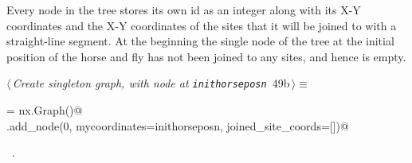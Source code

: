 \documentclass[11.5pt]{report}
\begin{document}
\vspace{-0.8cm} \newchunk Every node in the tree stores its own id as an integer along with 
its X-Y coordinates and the X-Y coordinates of the sites that it will be joined to with a 
straight-line segment. At the beginning the single node of the tree at the initial position
of the horse and fly has not been joined to any sites, and hence is empty. 

\begin{flushleft} \small
\begin{minipage}{\linewidth}\label{scrap76}\raggedright\small
{} $\langle\,${\itshape Create singleton graph, with node at \verb|inithorseposn|}\nobreak\ {\footnotesize {49b}}$\,\rangle\equiv$
\vspace{-1ex}
\begin{list}{}{} \item
\mbox{}\verb@G = nx.Graph()@\\
\mbox{}\verb@G.add_node(0, mycoordinates=inithorseposn, joined_site_coords=[])@\\
\mbox{}\verb@@{\NWsep}
\end{list}
\vspace{-1.5ex}
\footnotesize
\begin{list}{}{\setlength{\itemsep}{-\parsep}\setlength{\itemindent}{-\leftmargin}}
\item \NWtxtMacroRefIn\ .

\item{}
\end{list}
\end{minipage}\vspace{4ex}
\end{flushleft}
\end{document}
